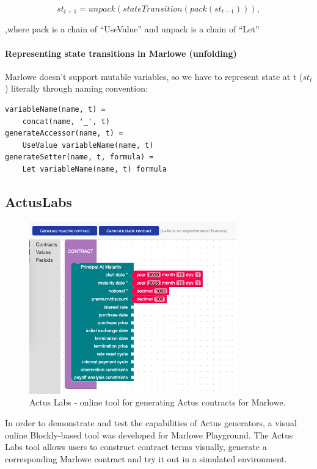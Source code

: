 \documentclass[runningheads]{llncs}
\begin{document}
\noindent 
\begin{equation}
st_{t+1}=unpack(stateTransition(pack(st_{t-1}))),
\end{equation}

,where pack is a chain of ``UseValue'' and unpack is a chain of
``Let''

\paragraph{Representing state transitions in Marlowe (unfolding)}

Marlowe doesn't support mutable variables, so we have to represent
state at t ($st_{t}$) literally through naming convention:

\begin{verbatim}
variableName(name, t) = 
	concat(name, '_', t) 
generateAccessor(name, t) = 
	UseValue variableName(name, t) 
generateSetter(name, t, formula) = 
	Let variableName(name, t) formula 
\end{verbatim}


\subsection{ActusLabs}

\begin{figure} 
\includegraphics[width=0.8\textwidth]{images/labs.png}
\caption{Actus Labs - online tool for generating Actus contracts for Marlowe.} 
\label{fig3} 
\end{figure} 

In order to demonstrate and test the capabilities of Actus generators,
a visual online Blockly-based tool was developed for Marlowe Playground.
The Actus Labs tool allows users to construct contract terms visually,
generate a corresponding Marlowe contract and try it out in a simulated
environment.
\end{document}
